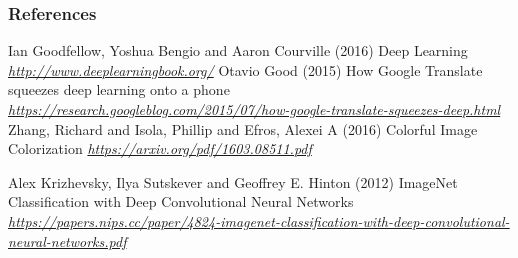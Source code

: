 \begin{vbframe}
\frametitle{References}
\footnotesize{
\begin{thebibliography}{99}
 Ian Goodfellow, Yoshua Bengio and Aaron Courville (2016)
\newblock Deep Learning
\newblock \emph{\url{http://www.deeplearningbook.org/}}
 Otavio Good (2015)
\newblock How Google Translate squeezes deep learning onto a phone
\newblock \emph{\url{https://research.googleblog.com/2015/07/how-google-translate-squeezes-deep.html}}
 Zhang, Richard and Isola, Phillip and Efros, Alexei A (2016)
\newblock Colorful Image Colorization
\newblock \emph{\url{https://arxiv.org/pdf/1603.08511.pdf}}

 Alex Krizhevsky, Ilya Sutskever and Geoffrey E. Hinton (2012)
\newblock ImageNet Classification with Deep Convolutional Neural Networks
\newblock \emph{\url{https://papers.nips.cc/paper/4824-imagenet-classification-with-deep-convolutional-neural-networks.pdf}}


\end{thebibliography}
}
\end{vbframe}
\endlecture

